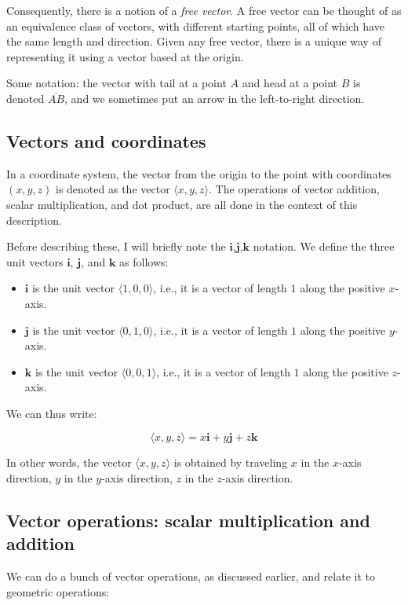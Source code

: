 \documentclass[10pt]{amsart}
\begin{document}
Consequently, there is a notion of a {\em free vector}. A free vector
can be thought of as an equivalence class of vectors, with different
starting points, all of which have the same length and
direction. Given any free vector, there is a unique way of
representing it using a vector based at the origin.  

Some notation: the vector with tail at a point $A$ and head at a point
$B$ is denoted $\overline{AB}$, and we sometimes put an arrow in the
left-to-right direction.
\subsection{Vectors and coordinates}

In a coordinate system, the vector from the origin to the point with
coordinates $(x,y,z)$ is denoted as the vector $\langle x,y,z
\rangle$. The operations of vector addition, scalar multiplication,
and dot product, are all done in the context of this description.

Before describing these, I will briefly note the
$\mathbf{i}$,$\mathbf{j}$,$\mathbf{k}$ notation. We define the three
unit vectors $\mathbf{i}$, $\mathbf{j}$, and $\mathbf{k}$ as follows:

\begin{itemize}
\item $\mathbf{i}$ is the unit vector $\langle 1,0,0 \rangle$, i.e.,
  it is a vector of length $1$ along the positive $x$-axis.
\item $\mathbf{j}$ is the unit vector $\langle 0,1,0 \rangle$, i.e.,
  it is a vector of length $1$ along the positive $y$-axis.
\item $\mathbf{k}$ is the unit vector $\langle 0,0,1 \rangle$, i.e.,
  it is a vector of length $1$ along the positive $z$-axis.
\end{itemize}

We can thus write:

$$\langle x,y,z \rangle = x \mathbf{i} + y \mathbf{j} + z \mathbf{k}$$

In other words, the vector $\langle x,y,z \rangle$ is obtained by
traveling $x$ in the $x$-axis direction, $y$ in the $y$-axis
direction, $z$ in the $z$-axis direction.

\subsection{Vector operations: scalar multiplication and addition}

We can do a bunch of vector operations, as discussed earlier, and
relate it to geometric operations:
\end{document}
